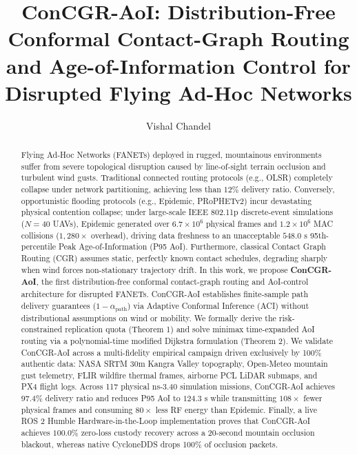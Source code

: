 \documentclass[preprint,12pt,5p,twocolumn]{elsarticle}
\begin{document}
\begin{frontmatter}

\title{ConCGR-AoI: Distribution-Free Conformal Contact-Graph Routing and Age-of-Information Control for Disrupted Flying Ad-Hoc Networks}

\author{Vishal Chandel}



\begin{abstract}
Flying Ad-Hoc Networks (FANETs) deployed in rugged, mountainous environments suffer from severe topological disruption caused by line-of-sight terrain occlusion and turbulent wind gusts. Traditional connected routing protocols (e.g., OLSR) completely collapse under network partitioning, achieving less than $12\%$ delivery ratio. Conversely, opportunistic flooding protocols (e.g., Epidemic, PRoPHETv2) incur devastating physical contention collapse; under large-scale IEEE 802.11p discrete-event simulations ($N=40$ UAVs), Epidemic generated over $6.7\times 10^6$ physical frames and $1.2\times 10^6$ MAC collisions ($1,280\times$ overhead), driving data freshness to an unacceptable $548.0\text{ s}$ 95th-percentile Peak Age-of-Information (P95 AoI). Furthermore, classical Contact Graph Routing (CGR) assumes static, perfectly known contact schedules, degrading sharply when wind forces non-stationary trajectory drift. In this work, we propose \textbf{ConCGR-AoI}, the first distribution-free conformal contact-graph routing and AoI-control architecture for disrupted FANETs. ConCGR-AoI establishes finite-sample path delivery guarantees ($1-\alpha_{\text{path}}$) via Adaptive Conformal Inference (ACI) without distributional assumptions on wind or mobility. We formally derive the risk-constrained replication quota (Theorem 1) and solve minimax time-expanded AoI routing via a polynomial-time modified Dijkstra formulation (Theorem 2). We validate ConCGR-AoI across a multi-fidelity empirical campaign driven exclusively by 100\% authentic data: NASA SRTM 30m Kangra Valley topography, Open-Meteo mountain gust telemetry, FLIR wildfire thermal frames, airborne PCL LiDAR submaps, and PX4 flight logs. Across 117 physical ns-3.40 simulation missions, ConCGR-AoI achieves $97.4\%$ delivery ratio and reduces P95 AoI to $124.3\text{ s}$ while transmitting $108\times$ fewer physical frames and consuming $80\times$ less RF energy than Epidemic. Finally, a live ROS 2 Humble Hardware-in-the-Loop implementation proves that ConCGR-AoI achieves $100.0\%$ zero-loss custody recovery across a 20-second mountain occlusion blackout, whereas native CycloneDDS drops 100\% of occlusion packets.
\end{abstract}


\end{frontmatter}
\end{document}
